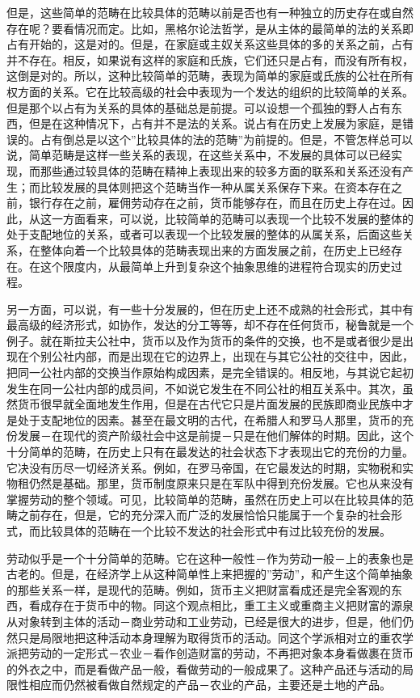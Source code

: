 \documentclass[a4paper,twoside,12pt]{ctexart}
\begin{document}
但是，这些简单的范畴在比较具体的范畴以前是否也有一种独立的历史存在或自然存在呢？要看情况而定。比如，黑格尔论法哲学，是从主体的最简单的法的关系即占有开始的，这是对的。但是，在家庭或主奴关系这些具体的多的关系之前，占有并不存在。相反，如果说有这样的家庭和氏族，它们还只是占有，而没有所有权，这倒是对的。所以，这种比较简单的范畴，表现为简单的家庭或氏族的公社在所有权方面的关系。它在比较高级的社会中表现为一个发达的组织的比较简单的关系。但是那个以占有为关系的具体的基础总是前提。可以设想一个孤独的野人占有东西，但是在这种情况下，占有并不是法的关系。说占有在历史上发展为家庭，是错误的。占有倒总是以这个”比较具体的法的范畴”为前提的。但是，不管怎样总可以说，简单范畴是这样一些关系的表现，在这些关系中，不发展的具体可以已经实现，而那些通过较具体的范畴在精神上表现出来的较多方面的联系和关系还没有产生；而比较发展的具体则把这个范畴当作一种从属关系保存下来。在资本存在之前，银行存在之前，雇佣劳动存在之前，货币能够存在，而且在历史上存在过。因此，从这一方面看来，可以说，比较简单的范畴可以表现一个比较不发展的整体的处于支配地位的关系，或者可以表现一个比较发展的整体的从属关系，后面这些关系，在整体向着一个比较具体的范畴表现出来的方面发展之前，在历史上已经存在。在这个限度内，从最简单上升到复杂这个抽象思维的进程符合现实的历史过程。

另一方面，可以说，有一些十分发展的，但在历史上还不成熟的社会形式，其中有最高级的经济形式，如协作，发达的分工等等，却不存在任何货币，秘鲁就是一个例子。就在斯拉夫公社中，货币以及作为货币的条件的交换，也不是或者很少是出现在个别公社内部，而是出现在它的边界上，出现在与其它公社的交往中，因此，把同一公社内部的交换当作原始构成因素，是完全错误的。相反地，与其说它起初发生在同一公社内部的成员间，不如说它发生在不同公社的相互关系中。其次，虽然货币很早就全面地发生作用，但是在古代它只是片面发展的民族即商业民族中才是处于支配地位的因素。甚至在最文明的古代，在希腊人和罗马人那里，货币的充份发展－在现代的资产阶级社会中这是前提－只是在他们解体的时期。因此，这个十分简单的范畴，在历史上只有在最发达的社会状态下才表现出它的充份的力量。它决没有历尽一切经济关系。例如，在罗马帝国，在它最发达的时期，实物税和实物租仍然是基础。那里，货币制度原来只是在军队中得到充份发展。它也从来没有掌握劳动的整个领域。可见，比较简单的范畴，虽然在历史上可以在比较具体的范畴之前存在，但是，它的充分深入而广泛的发展恰恰只能属于一个复杂的社会形式，而比较具体的范畴在一个比较不发达的社会形式中有过比较充份的发展。

劳动似乎是一个十分简单的范畴。它在这种一般性－作为劳动一般－上的表象也是古老的。但是，在经济学上从这种简单性上来把握的”劳动”，和产生这个简单抽象的那些关系一样，是现代的范畴。例如，货币主义把财富看成还是完全客观的东西，看成存在于货币中的物。同这个观点相比，重工主义或重商主义把财富的源泉从对象转到主体的活动－商业劳动和工业劳动，已经是很大的进步，但是，他们仍然只是局限地把这种活动本身理解为取得货币的活动。同这个学派相对立的重农学派把劳动的一定形式－农业－看作创造财富的劳动，不再把对象本身看做裹在货币的外衣之中，而是看做产品一般，看做劳动的一般成果了。这种产品还与活动的局限性相应而仍然被看做自然规定的产品－农业的产品，主要还是土地的产品。
\end{document}
